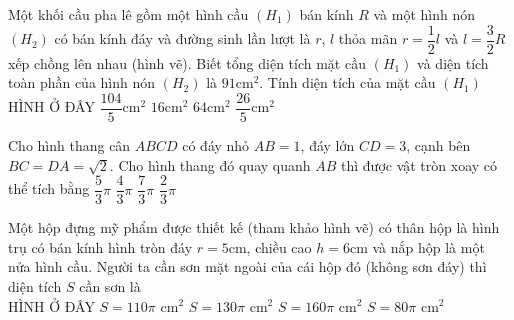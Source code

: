 \begin{ex}
	Một khối cầu pha lê gồm một hình cầu $\left(H_1\right)$ bán kính $R$ và một hình nón $\left(H_2\right)$ có bán kính đáy và đường sinh lần lượt là $r$, $l$ thỏa mãn $r=\dfrac{1}{2}l$ và $l=\dfrac{3}{2}R$ xếp chồng lên nhau (hình vẽ). Biết tổng diện tích mặt cầu $\left(H_1\right)$ và diện tích toàn phần của hình nón $\left(H_2\right)$ là $91\mathrm{cm}^2$. Tính diện tích của mặt cầu $\left(H_1\right)$\\
	{\color{red}HÌNH Ở ĐÂY}
	\choice
	{$\dfrac{104}{5}\mathrm{cm}^2$}
	{$16\mathrm{cm}^2$}
	{\True $64\mathrm{cm}^2$}
	{$\dfrac{26}{5}\mathrm{cm}^2$}
\end{ex}
\begin{ex}
	Cho hình thang cân $ABCD$ có đáy nhỏ $AB=1$, đáy lớn $CD=3$, cạnh bên $BC=DA=\sqrt{2}$. Cho hình thang đó quay quanh $AB$ thì được vật tròn xoay có thể tích bằng
	\choice
	{$\dfrac{5}{3}\pi $}
	{$\dfrac{4}{3}\pi $}
	{\True $\dfrac{7}{3}\pi $}
	{$\dfrac{2}{3}\pi $}
\end{ex}
\begin{ex}
	Một hộp đựng mỹ phẩm được thiết kế (tham khảo hình vẽ) có thân hộp là hình trụ có bán kính hình tròn đáy $r=5\mathrm{cm}$, chiều cao $h=6\mathrm{cm}$ và nắp hộp là một nửa hình cầu. Người ta cần sơn mặt ngoài của cái hộp đó (không sơn đáy) thì diện tích $S$ cần sơn là\\
	{\color{red}HÌNH Ở ĐÂY}
	\choice
	{\True $S=110\pi $ $\mathrm{cm}^2$}
	{$S=130\pi $ $\mathrm{cm}^2$}
	{$S=160\pi $ $\mathrm{cm}^2$}
	{$S=80\pi $ $\mathrm{cm}^2$}
\end{ex}
